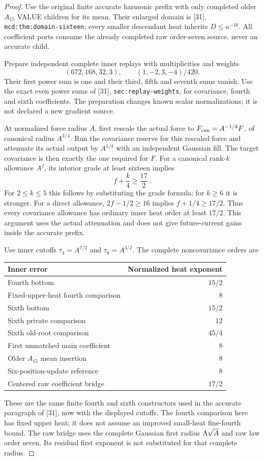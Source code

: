\documentclass[11pt]{article}
\numberwithin{equation}{section}
\theoremstyle{remark}\newtheorem{remark}[theorem]{Remark}
\newcommand{\src}[1]{\texttt{\nolinkurl{#1}}}
\begin{document}
\begin{proof}
Use the original finite accurate harmonic prefix with only completed
older $A_{15}$ VALUE children for its mean. Their enlarged domain is
[31], \src{mcd:thm:domain-sixteen}; every smaller descendant heat
inherits $D\le a^{-16}$. All coefficient ports consume the already
completed raw order-seven source, never an accurate child.

Prepare independent complete inner replays with multiplicities and weights
\[
 (672,168,32,3),\qquad (1,-2,3,-4)/420.
\]
Their first power sum is one
and their third, fifth and seventh sums vanish. Use the exact even
power sums of [31], \src{sec:replay-weights}, for covariance,
fourth and sixth coefficients. The preparation changes known scalar
normalizations; it is not declared a new gradient source.

At normalized force radius $A$, first rescale the actual force
to $F_{\rm can}=A^{-1/4}F$, of canonical radius $A^{3/4}$.
Run the covariance reserve for this rescaled force and attenuate
its actual output by $A^{1/4}$ with an independent Gaussian fill.
The target covariance is then exactly the one required for $F$.
For a canonical
rank-$k$ allowance $A^f$, its interior grade at least sixteen
implies
\[
 f+\frac k4\ge\frac{17}{2}\,.
\]
For $2\le k\le5$ this follows by substituting the grade formula;
for $k\ge6$ it is stronger. For a direct allowance,
$2f-1/2\ge16$ implies $f+1/4\ge17/2$.
Thus every covariance allowance has ordinary inner heat order
at least $17/2$. This argument uses the actual attenuation and
does not give future-current gains inside the accurate prefix.

Use inner cutoffs $\tau_4=A^{7/2}$ and $\tau_6=A^{3/2}$.
The complete noncovariance orders are
\begin{center}
\begin{tabular}{lr}
\toprule
Inner error&Normalized heat exponent\\
\midrule
Fourth bottom&$15/2$\\
Fixed-upper-heat fourth comparison&$8$\\
Sixth bottom&$15/2$\\
Sixth private comparison&$12$\\
Sixth old-root comparison&$45/4$\\
First unmatched main coefficient&$8$\\
Older $A_{15}$ mean insertion&$8$\\
Six-position-update reference&$8$\\
Centered raw coefficient bridge&$17/2$\\
\bottomrule
\end{tabular}
\end{center}
These are the same finite fourth and sixth constructors used in
the accurate paragraph of [31], now with the displayed cutoffs.
The fourth comparison here has fixed upper heat; it does not
assume an improved small-heat fine-fourth bound. The raw bridge
uses the complete Gaussian first radius $\Lambda\sqrt A$ and raw
law order seven. Its residual first exponent is not substituted
for that complete radius.


\end{proof}
\end{document}
